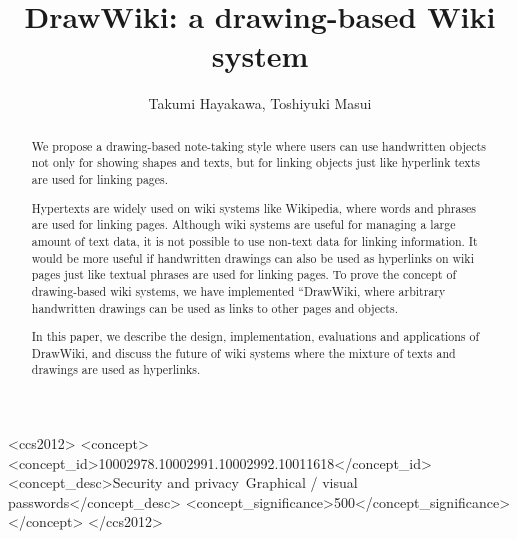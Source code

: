 \documentclass[sigconf]{acmart}
\begin{document}
\title{DrawWiki: a drawing-based Wiki system}


\author{Takumi Hayakawa,\hspace{1em} Toshiyuki Masui}

\renewcommand{\shortauthors}{T. Hayakawa}

\begin{CCSXML}
  <ccs2012>
  <concept>
  <concept_id>10002978.10002991.10002992.10011618</concept_id>
  <concept_desc>Security and privacy~Graphical / visual passwords</concept_desc>
  <concept_significance>500</concept_significance>
  </concept>
  </ccs2012>
\end{CCSXML}


\begin{abstract}

We propose a drawing-based note-taking style where users can use
handwritten objects not only for showing shapes and texts, but for
linking objects just like hyperlink texts are used for linking pages.

Hypertexts are widely used on wiki systems like Wikipedia, where words
and phrases are used for linking pages. Although wiki systems are
useful for managing a large amount of text data, it is not possible to
use non-text data for linking information. It would be more useful if
handwritten drawings can also be used as hyperlinks on wiki pages just
like textual phrases are used for linking pages. To prove the concept
of drawing-based wiki systems, we have implemented “DrawWiki,
where arbitrary handwritten drawings can be used as
links to other pages and objects.

In this paper, we describe the design, implementation, evaluations and
applications of DrawWiki, and discuss the future of wiki systems where
the mixture of texts and drawings are used as hyperlinks.

\end{abstract}
\end{document}

